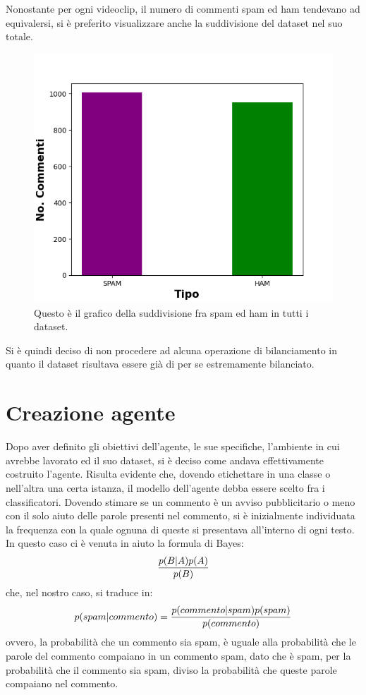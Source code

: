 \documentclass{report}
\begin{document}
   Nonostante per ogni videoclip, il numero di commenti spam ed ham tendevano ad equivalersi, si è preferito visualizzare
   anche la suddivisione del dataset nel suo totale.
    \newpage
    \begin{figure}[h!]
        \centering
        \includegraphics[height = 0.6\textwidth]{immagini/DatasetUnico.png}
        \caption{Questo è il grafico della suddivisione fra spam ed ham in tutti i dataset.}
    \end{figure}

    Si è quindi deciso di non procedere ad alcuna operazione di bilanciamento in quanto il dataset 
    risultava essere già di per se estremamente bilanciato.

    \chapter{Creazione agente}


    Dopo aver definito gli obiettivi dell'agente, le sue specifiche, l'ambiente in cui avrebbe lavorato ed il suo dataset, si è deciso come andava effettivamente costruito l'agente.
    Risulta evidente che, dovendo etichettare in una classe o nell’altra una certa istanza, il modello dell’agente debba essere scelto fra i classificatori. Dovendo stimare se un commento è un avviso pubblicitario o meno con il solo aiuto delle parole presenti nel commento, si è inizialmente individuata la frequenza con la quale ognuna di queste si presentava all’interno di ogni testo.
    In questo caso ci è venuta in aiuto la formula di Bayes:
    \newline
    \begin{equation}\label{bho}
        { p(B|A)  p(A)\over p(B)}
    \end{equation}
    \newline
    che, nel nostro caso, si traduce in:
    \newline
    \begin{equation}\label{bho2}
        p(spam|commento) = { p(commento|spam)  p(spam)\over p(commento)}
    \end{equation}
    \newline
    ovvero, la probabilità che un commento sia spam, è uguale alla probabilità che le parole del commento compaiano in un commento spam, dato che è spam, per la probabilità 
    che il commento sia spam, diviso la probabilità che queste parole compaiano nel commento.
\end{document}
